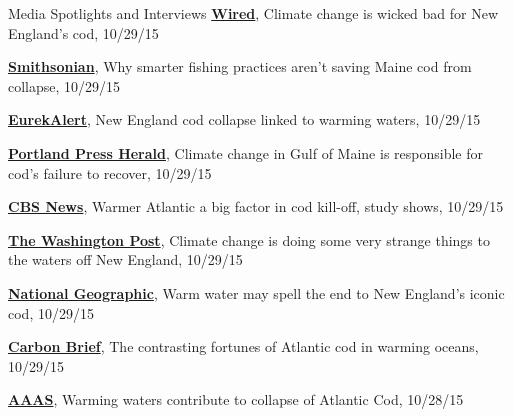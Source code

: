 \documentclass{resume} %
\begin{document}
\begin{rSection}{Media Spotlights and Interviews}
\href{http://www.wired.com/2015/10/climate-change-is-wicked-bad-for-new-englands-cod-fishery/}{\textbf{Wired}}, Climate change is wicked bad for New England’s cod, 10/29/15

\href{http://www.smithsonianmag.com/science-nature/why-smarter-fishing-practices-arent-saving-maine-cod-collapse-180957096/?no-ist}{\textbf{Smithsonian}}, Why smarter fishing practices aren’t saving Maine cod from collapse, 10/29/15

\href{http://www.eurekalert.org/pub_releases/2015-10/aaft-nec102615.php}{\textbf{EurekAlert}}, New England cod collapse linked to warming waters, 10/29/15

\href{http://www.pressherald.com/2015/10/29/study-climate-change-in-gulf-of-maine-is-responsible-for-cods-failure-to-recover/}{\textbf{Portland Press Herald}}, Climate change in Gulf of Maine is responsible for cod’s failure to recover, 10/29/15

\href{http://www.cbsnews.com/news/a-warmer-atlantic-is-helping-kill-off-the-cod/}{\textbf{CBS News}}, Warmer Atlantic a big factor in cod kill-off, study shows, 10/29/15

\href{https://www.washingtonpost.com/news/energy-environment/wp/2015/10/29/climate-change-is-doing-some-strange-things-to-the-waters-off-new-england/}{\textbf{The Washington Post}}, Climate change is doing some very strange things to the waters off New England, 10/29/15

\href{http://theplate.nationalgeographic.com/2015/10/29/warm-water-may-spell-the-end-of-new-englands-iconic-cod/}{\textbf{National Geographic}}, Warm water may spell the end to New England’s iconic cod, 10/29/15

\href{http://www.carbonbrief.org/the-contrasting-fortunes-of-atlantic-cod-in-warming-oceans}{\textbf{Carbon Brief}}, The contrasting fortunes of Atlantic cod in warming oceans, 10/29/15

\href{http://www.aaas.org/news/science-warming-waters-contribute-collapse-atlantic-cod}{\textbf{AAAS}}, Warming waters contribute to collapse of Atlantic Cod, 10/28/15

\endgroup

\end{rSection}

\end{document}
